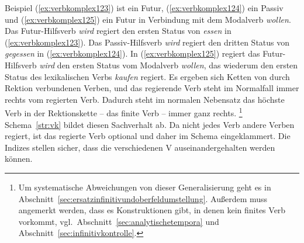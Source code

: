 \begin{exe}
  \ex\label{ex:verbkomplex122}
  \begin{xlist}
  \end{xlist}
\end{exe}


Beispiel (\ref{ex:verbkomplex123}) ist ein Futur, (\ref{ex:verbkomplex124}) ein Passiv und (\ref{ex:verbkomplex125}) ein Futur in Verbindung mit dem Modalverb \textit{wollen}.
Das Futur-Hilfsverb \textit{wird} regiert den ersten Status von \textit{essen} in (\ref{ex:verbkomplex123}).
Das Passiv-Hilfsverb \textit{wird} regiert den dritten Status von \textit{gegessen} in (\ref{ex:verbkomplex124}).
In (\ref{ex:verbkomplex125}) regiert das Futur-Hilfsverb \textit{wird} den ersten Status vom Modalverb \textit{wollen}, das wiederum den ersten Status des lexikalischen Verbs \textit{kaufen} regiert.
Es ergeben sich Ketten von durch Rektion verbundenen Verben, und das regierende Verb steht im Normalfall immer rechts vom regierten Verb.
Dadurch steht im normalen Nebensatz das höchste Verb in der Rektionskette -- das finite Verb -- immer ganz rechts.%
\footnote{Um systematische Abweichungen von dieser Generalisierung geht es in Abschnitt~\ref{sec:ersatzinfinitivundoberfeldumstellung}.
Außerdem muss angemerkt werden, dass es Konstruktionen gibt, in denen kein finites Verb vorkommt, vgl.\ Abschnitt~\ref{sec:analytischetempora} und Abschnitt~\ref{sec:infinitivkontrolle}.}
Schema~\ref{str:vk} bildet diesen Sachverhalt ab.
Da nicht jedes Verb andere Verben regiert, ist das regierte Verb optional und daher im Schema eingeklammert.
Die Indizes stellen sicher, dass die verschiedenen V auseinandergehalten werden können.



